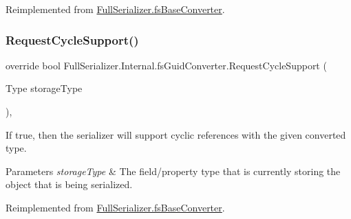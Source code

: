 Reimplemented from \hyperlink{class_full_serializer_1_1fs_base_converter_a415ea2ac9429bbb9927346af7cb7c2e1}{Full\+Serializer.\+fs\+Base\+Converter}.

\mbox{\label{class_full_serializer_1_1_internal_1_1fs_guid_converter_aaeaf4b6d5206b2b70f0d9d2d79a5efe7}} 
\subsubsection{\texorpdfstring{Request\+Cycle\+Support()}{RequestCycleSupport()}}
{\footnotesize\ttfamily override bool Full\+Serializer.\+Internal.\+fs\+Guid\+Converter.\+Request\+Cycle\+Support (\begin{DoxyParamCaption}\item[{Type}]{storage\+Type }\end{DoxyParamCaption})\hspace{0.3cm}{\ttfamily [inline]}, {\ttfamily [virtual]}}



If true, then the serializer will support cyclic references with the given converted type. 


\begin{DoxyParams}{Parameters}
{\em storage\+Type} & The field/property type that is currently storing the object that is being serialized.\\
\hline
\end{DoxyParams}


Reimplemented from \hyperlink{class_full_serializer_1_1fs_base_converter_a4e850ab88cea1b89771c00e0b65febcd}{Full\+Serializer.\+fs\+Base\+Converter}.

\mbox{\label{class_full_serializer_1_1_internal_1_1fs_guid_converter_a4556062bfaec5d51b7c1120bf1388a4c}} 
